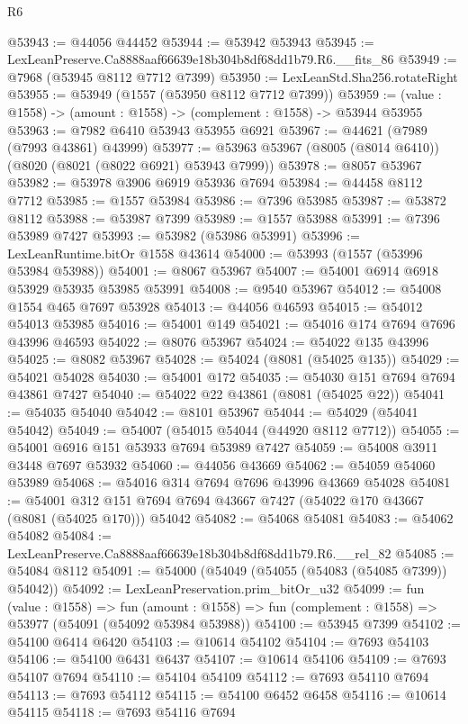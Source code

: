 \begin{lexlean}{R6}
\begin{coremodule}
@53943 := @44056 @44452
@53944 := @53942 @53943
@53945 := LexLeanPreserve.Ca8888aaf66639e18b304b8df68dd1b79.R6.__fits_86
@53949 := @7968 (@53945 @8112 @7712 @7399)
@53950 := LexLeanStd.Sha256.rotateRight
@53955 := @53949 (@1557 (@53950 @8112 @7712 @7399))
@53959 := (value : @1558) -> (amount : @1558) -> (complement : @1558) -> @53944 @53955
@53963 := @7982 @6410 @53943 @53955 @6921
@53967 := @44621 (@7989 (@7993 @43861) @43999)
@53977 := @53963 @53967 (@8005 (@8014 @6410)) (@8020 (@8021 (@8022 @6921) @53943 @7999))
@53978 := @8057 @53967
@53982 := @53978 @3906 @6919 @53936 @7694
@53984 := @44458 @8112 @7712
@53985 := @1557 @53984
@53986 := @7396 @53985
@53987 := @53872 @8112
@53988 := @53987 @7399
@53989 := @1557 @53988
@53991 := @7396 @53989 @7427
@53993 := @53982 (@53986 @53991)
@53996 := LexLeanRuntime.bitOr @1558 @43614
@54000 := @53993 (@1557 (@53996 @53984 @53988))
@54001 := @8067 @53967
@54007 := @54001 @6914 @6918 @53929 @53935 @53985 @53991
@54008 := @9540 @53967
@54012 := @54008 @1554 @465 @7697 @53928
@54013 := @44056 @46593
@54015 := @54012 @54013 @53985
@54016 := @54001 @149
@54021 := @54016 @174 @7694 @7696 @43996 @46593
@54022 := @8076 @53967
@54024 := @54022 @135 @43996
@54025 := @8082 @53967
@54028 := @54024 (@8081 (@54025 @135))
@54029 := @54021 @54028
@54030 := @54001 @172
@54035 := @54030 @151 @7694 @7694 @43861 @7427
@54040 := @54022 @22 @43861 (@8081 (@54025 @22))
@54041 := @54035 @54040
@54042 := @8101 @53967
@54044 := @54029 (@54041 @54042)
@54049 := @54007 (@54015 @54044 (@44920 @8112 @7712))
@54055 := @54001 @6916 @151 @53933 @7694 @53989 @7427
@54059 := @54008 @3911 @3448 @7697 @53932
@54060 := @44056 @43669
@54062 := @54059 @54060 @53989
@54068 := @54016 @314 @7694 @7696 @43996 @43669 @54028
@54081 := @54001
    @312
    @151
    @7694
    @7694
    @43667
    @7427
    (@54022 @170 @43667 (@8081 (@54025 @170)))
    @54042
@54082 := @54068 @54081
@54083 := @54062 @54082
@54084 := LexLeanPreserve.Ca8888aaf66639e18b304b8df68dd1b79.R6.__rel_82
@54085 := @54084 @8112
@54091 := @54000 (@54049 (@54055 (@54083 (@54085 @7399)) @54042))
@54092 := LexLeanPreservation.prim_bitOr_u32
@54099 := fun (value : @1558) =>
  fun (amount : @1558) => fun (complement : @1558) => @53977 (@54091 (@54092 @53984 @53988))
@54100 := @53945 @7399
@54102 := @54100 @6414 @6420
@54103 := @10614 @54102
@54104 := @7693 @54103
@54106 := @54100 @6431 @6437
@54107 := @10614 @54106
@54109 := @7693 @54107 @7694
@54110 := @54104 @54109
@54112 := @7693 @54110 @7694
@54113 := @7693 @54112
@54115 := @54100 @6452 @6458
@54116 := @10614 @54115
@54118 := @7693 @54116 @7694

\end{coremodule}
\end{lexlean}
